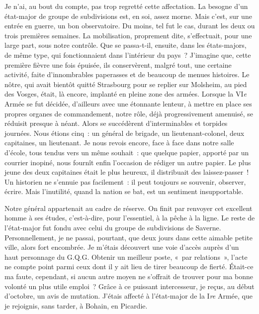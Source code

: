 \documentclass[french,twoside]{book} %
\begin{document}
Je n’ai, au bout du compte, pas trop regretté cette affectation. La besogne d’un état-major de groupe de subdivisions est, en soi, assez morne. Mais c’est, sur une entrée en guerre, un bon observatoire. Du moins, tel fut le cas, durant les deux ou trois premières semaines. La mobilisation, proprement dite, s’effectuait, pour une large part, sous notre contrôle. Que se passa-t-il, ensuite, dans les états-majors, de même type, qui fonctionnaient dans l’intérieur du pays ? J’imagine que, cette première fièvre une fois épuisée, ils conservèrent, malgré tout, une certaine activité, faite d’innombrables paperasses et de beaucoup de menues histoires. Le nôtre, qui avait bientôt quitté Strasbourg pour se replier sur Molsheim, au pied des Vosges, était, là encore, implanté en pleine zone des armées. Lorsque la VI\emph{e} Armée se fut décidée, d’ailleurs avec une étonnante lenteur, à mettre   en place ses propres organes de commandement, notre rôle, déjà progressivement amenuisé, se réduisit presque à néant. Alors se succédèrent d’interminables et torpides journées. Nous étions cinq : un général de brigade, un lieutenant-colonel, deux capitaines, un lieutenant. Je nous revois encore, face à face dans notre salle d’école, tous tendus vers un même souhait : que quelque papier, apporté par un courrier inopiné, nous fournît enfin l’occasion de rédiger un autre papier. Le plus jeune des deux capitaines était le plus heureux, il distribuait des laissez-passer ! Un historien ne s’ennuie pas facilement : il peut toujours se souvenir, observer, écrire. Mais l’inutilité, quand la nation se bat, est un sentiment insupportable.\par
Notre général appartenait au cadre de réserve. On finit par renvoyer cet excellent homme à ses études, c’est-à-dire, pour l’essentiel, à la pêche à la ligne. Le reste de l’état-major fut fondu avec celui du groupe de subdivisions de Saverne. Personnellement, je ne passai, pourtant, que deux jours dans cette aimable petite ville, alors fort encombrée. Je m’étais découvert une voie d’accès auprès d’un haut personnage du G.Q.G. Obtenir un meilleur poste, « par relations », l’acte ne compte point parmi ceux dont il y ait lieu de tirer beaucoup de fierté. Était-ce ma faute, cependant, si aucun autre moyen ne s’offrait de trouver pour ma bonne volonté un plus utile emploi ? Grâce à ce puissant intercesseur, je reçus, au début d’octobre, un avis de mutation. J’étais affecté à l’état-major de la I\emph{re} Armée, que je rejoignis, sans tarder, à Bohain, en Picardie.\par
\end{document}
